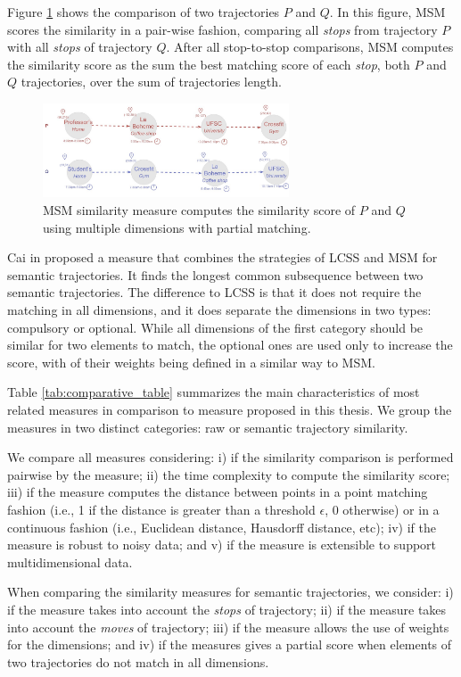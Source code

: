 {Figure {\ref{fig:related_trajes_MSM}} shows the comparison of two trajectories $P$ and $Q$. In this figure, MSM scores the similarity in a pair-wise fashion, comparing all \emph{stops} from trajectory $P$ with all \emph{stops} of trajectory $Q$. After all stop-to-stop comparisons, MSM computes the similarity score as the sum the best matching score of each \emph{stop}, both $P$ and $Q$ trajectories, over the sum of trajectories length.}

\begin{figure}[h]
\centering
\includegraphics[width=0.65\textwidth]{Related_Works/Semantic_Trajectories_(MSM).jpg}
\caption{\label{fig:related_trajes_MSM}MSM similarity measure computes the similarity score of $P$ and $Q$ using multiple dimensions with partial matching.}
\end{figure}


Cai in \cite{CaiLee2016} proposed a measure that combines the strategies of LCSS \cite{vlachos2002discovering} and MSM\cite{Furtado:TGIS12156} for semantic trajectories. It finds the longest common subsequence between two semantic trajectories. The difference to LCSS is that it does not require the matching in all dimensions, and it does separate the dimensions in two types: compulsory or optional. While all dimensions of the first category should be similar for two elements to match, the optional ones are used only to increase the score, with of their weights being defined in a similar way to MSM.

{Table {\ref{tab:comparative_table}} summarizes the main characteristics of most related measures in comparison to measure proposed in this thesis. We group the measures in two distinct categories: raw or semantic trajectory similarity.

We compare all measures considering: i) if the similarity comparison is performed pairwise by the measure; ii) the time complexity to compute the similarity score; iii) if the measure computes the distance between points in a point matching fashion (i.e., 1 if the distance is greater than a threshold $\epsilon$, 0 otherwise)  or in a continuous fashion (i.e., Euclidean distance, Hausdorff distance, etc); iv) if the measure is robust to noisy data; and v) if the measure is extensible to support multidimensional data.

When comparing the similarity measures for semantic trajectories, we consider: i) if the measure takes into account the \emph{stops} of trajectory; ii) if the measure takes into account the \emph{moves} of trajectory; iii) if the measure allows the use of weights for the dimensions; and iv) if the measures gives a partial score when elements of two trajectories do not match in all dimensions.}

